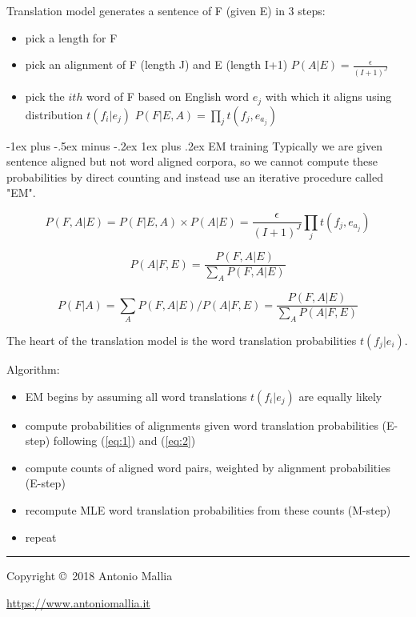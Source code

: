 \documentclass[10pt,landscape]{article}
\makeatletter
\renewcommand{\subsubsection}{\@startsection{subsubsection}{3}{0mm}%
                                {-1ex plus -.5ex minus -.2ex}%
                                {1ex plus .2ex}%
                                {\normalfont\small\bfseries}}
\makeatother
\begin{document}
\begin{multicols}{3}
Translation model generates a sentence of F (given E) in 3 steps:
\begin{itemize}
	\item pick a length for F
	\item pick an alignment of F (length J) and E (length I+1) $P(A|E) = \frac{\epsilon}{(I+1)^J}$
	\item pick the $ith$ word of F based on English word $e_j$ with which it aligns using distribution $t(f_i | e_j)$
		$P(F| E,A) = \prod_j t(f_j, e_{a_j})$\\
\end{itemize}

\subsubsection{EM training}
Typically we are given sentence aligned but not word aligned corpora, so we cannot compute these probabilities by direct counting and instead use an iterative procedure called "EM".

\begin{equation} \label{eq:1}
P(F, A | E) = P(F| E,A) \times P(A|E)
			= \frac{\epsilon}{(I+1)^J} \prod_j t(f_j, e_{a_j})
\end{equation}

\begin{equation} \label{eq:2}
P(A| F, E) =\frac{P(F, A | E)}{\sum_A P(F, A|E)}
\end{equation}

\begin{equation*}
P(F|A) = \sum_A P(F, A | E) / P(A|F,E) = \frac{P(F, A | E)}{\sum_A P(A|F,E)}
\end{equation*}

The heart of the translation model is the word translation probabilities $t(f_j | e_i)$.


Algorithm:
\begin{itemize}
	\item EM begins by assuming all word translations $t(f_i | e_j)$ are equally likely
	\item compute probabilities of alignments given word translation probabilities (E-step) following (\ref{eq:1}) and (\ref{eq:2})
	\item compute counts of aligned word pairs, weighted by alignment probabilities (E-step) 
	\item recompute MLE word translation probabilities from these counts (M-step)
	\item repeat
\end{itemize}



\rule{0.3\linewidth}{0.25pt}
\scriptsize

Copyright \copyright\ 2018 Antonio Mallia

\href{https://www.antoniomallia.it}{https://www.antoniomallia.it}


\end{multicols}
\end{document}
